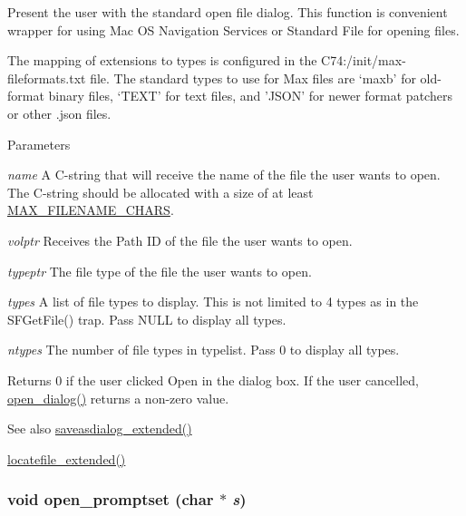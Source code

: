 Present the user with the standard open file dialog. This function is convenient wrapper for using Mac OS Navigation Services or Standard File for opening files.

The mapping of extensions to types is configured in the C74:/init/max-\/fileformats.txt file. The standard types to use for Max files are ‘maxb’ for old-\/format binary files, ‘TEXT’ for text files, and 'JSON' for newer format patchers or other .json files.


\begin{DoxyParams}{Parameters}
\item[{\em name}]A C-\/string that will receive the name of the file the user wants to open. The C-\/string should be allocated with a size of at least \hyperlink{group__files_ga481556de2ccf516a499525edebc45ee8}{MAX\_\-FILENAME\_\-CHARS}. \item[{\em volptr}]Receives the Path ID of the file the user wants to open. \item[{\em typeptr}]The file type of the file the user wants to open. \item[{\em types}]A list of file types to display. This is not limited to 4 types as in the SFGetFile() trap. Pass NULL to display all types. \item[{\em ntypes}]The number of file types in typelist. Pass 0 to display all types.\end{DoxyParams}
\begin{DoxyReturn}{Returns}
0 if the user clicked Open in the dialog box. If the user cancelled, \hyperlink{group__files_ga0d8fd0b13e2e623298a45e846af3fe1a}{open\_\-dialog()} returns a non-\/zero value.
\end{DoxyReturn}
\begin{DoxySeeAlso}{See also}
\hyperlink{group__files_gad43815aaa436e518a5cc68d2a340e4de}{saveasdialog\_\-extended()} 

\hyperlink{group__files_gaa2899b66e1457da0ee333f9407230ccd}{locatefile\_\-extended()} 
\end{DoxySeeAlso}
\hypertarget{group__files_gaff6d7264cad52c579b9373870bed50db}{
\subsubsection[{open\_\-promptset}]{\setlength{\rightskip}{0pt plus 5cm}void open\_\-promptset (char $\ast$ {\em s})}}
\label{group__files_gaff6d7264cad52c579b9373870bed50db}


